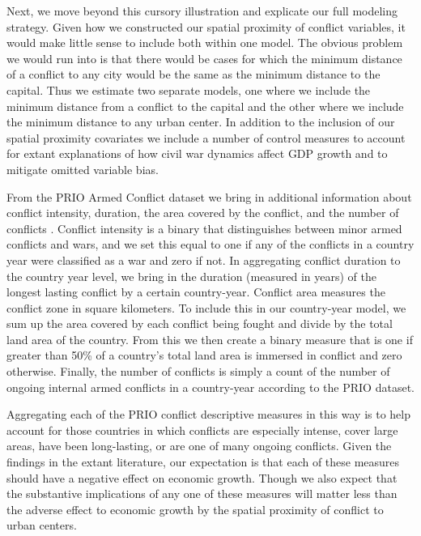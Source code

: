 
Next, we move beyond this cursory illustration and explicate our full modeling strategy. Given how we constructed our spatial proximity of conflict variables, it would make little sense to include both within one model. The obvious problem we would run into is that there would be cases for which the minimum distance of a conflict to any city would be the same as the minimum distance to the capital. Thus we estimate two separate models, one where we include the minimum distance from a conflict to the capital and the other where we include the minimum distance to any urban center. In addition to the inclusion of our spatial proximity covariates we include a number of control measures to account for extant explanations of how civil war dynamics affect GDP growth and to mitigate omitted variable bias. 

From the PRIO Armed Conflict dataset we bring in additional information about conflict intensity, duration, the area covered by the conflict, and the number of conflicts \citep{themner:wallensteen:2014}. Conflict intensity is a binary that distinguishes between minor armed conflicts and wars, and we set this equal to one if any of the conflicts in a country year were classified as a war and zero if not. In aggregating conflict duration to the country year level, we bring in the duration (measured in years) of the longest lasting conflict by a certain country-year. Conflict area measures the conflict zone in square kilometers. To include this in our country-year model, we sum up the area covered by each conflict being fought and divide by the total land area of the country. From this we then create a binary measure that is one if greater than 50\% of a country's total land area is immersed in conflict and zero otherwise. Finally, the number of conflicts is simply a count of the number of ongoing internal armed conflicts in a country-year according to the PRIO dataset.

Aggregating each of the PRIO conflict descriptive measures in this way is to help account for those countries in which conflicts are especially intense, cover large areas, have been long-lasting, or are one of many ongoing conflicts. Given the findings in the extant literature, our expectation is that each of these measures should have a negative effect on economic growth. Though we also expect that the substantive implications of any one of these measures will matter less than the adverse effect to economic growth by the spatial proximity of conflict to urban centers.

